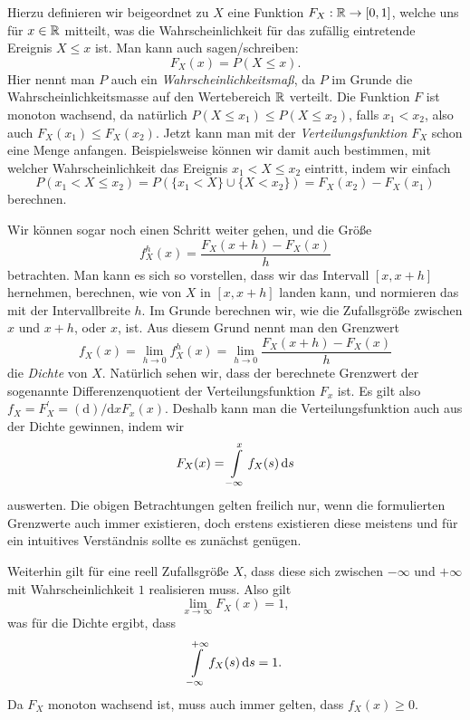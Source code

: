 Hierzu definieren wir beigeordnet zu $X$ eine Funktion $F_X: \mathbb{R} \rightarrow [0,1]$, welche uns für $x \in \mathbb{R}$ mitteilt, was die Wahrscheinlichkeit für das zufällig eintretende Ereignis $X \leqslant x$ ist.
Man kann auch sagen/schreiben:
\begin{equation}
    \label{eq:random:cdf}
    F_X(x) = P(X \leqslant x).
\end{equation}
Hier nennt man $P$ auch ein \emph{Wahrscheinlichkeitsmaß}, da $P$ im Grunde die Wahrscheinlichkeitsmasse auf den Wertebereich $\mathbb{R}$ verteilt.
Die Funktion $F$ ist monoton wachsend, da natürlich $P(X \leqslant x_1) \leqslant P(X \leqslant x_2)$, falls $x_1 < x_2$, also auch $F_X(x_1) \leqslant F_X(x_2)$.
Jetzt kann man mit der \emph{Verteilungsfunktion} $F_X$ schon eine Menge anfangen.
Beispielsweise können wir damit auch bestimmen, mit welcher Wahrscheinlichkeit das Ereignis $x_1 < X \leqslant x_2$ eintritt, indem wir einfach 
\[
P(x_1 < X \leqslant x_2) = P(\{x_1 < X\} \cup \{X < x_2\}) = F_X(x_2) - F_X(x_1)
\]
berechnen.

Wir können sogar noch einen Schritt weiter gehen, und die Größe
\begin{equation}
    \label{eq:random:pdf_approx}
    f^h_X(x) = \frac{F_X(x + h) - F_X(x)}{h}
\end{equation}
betrachten.
Man kann es sich so vorstellen, dass wir das Intervall $[x,x+h]$ hernehmen, berechnen, wie  von $X$ in $[x,x+h]$ landen kann, und normieren das mit der Intervallbreite $h$.
Im Grunde berechnen wir, wie  die Zufallsgröße zwischen $x$ und $x+h$, oder  $x$, ist.
Aus diesem Grund nennt man den Grenzwert
\begin{equation}
    \label{eq:random:density}
    f_X(x) = \lim\limits_{h \rightarrow 0} f^h_X(x) = \lim\limits_{h \rightarrow 0} \frac{F_X(x + h) - F_X(x)}{h}
\end{equation}
die \emph{Dichte} von $X$.
Natürlich sehen wir, dass der berechnete Grenzwert der sogenannte Differenzenquotient der Verteilungsfunktion $F_x$ ist. Es gilt also $f_X = F^\prime_X = (\mathrm d)/{\mathrm d x} F_{x}(x)$.
Deshalb kann man die Verteilungsfunktion auch aus der Dichte gewinnen, indem wir
\[
F_X(x) = {\int\limits_{-\infty}^{x}{f_X(s)}\,\mathrm{d}{s}}
\]
auswerten.
Die obigen Betrachtungen gelten freilich nur, wenn die formulierten Grenzwerte auch immer existieren, doch erstens existieren diese meistens und für ein intuitives Verständnis sollte es zunächst genügen.

Weiterhin gilt für eine reell Zufallsgröße $X$, dass diese sich  zwischen $-\infty$ und $+\infty$ mit Wahrscheinlichkeit $1$ realisieren muss.
Also gilt
\[
\lim_{x \rightarrow \infty} F_X(x) = 1,
\]
was für die Dichte ergibt, dass
\[
{\int\limits_{-\infty}^{+\infty}{f_X(s)}\,\mathrm{d}{s}} = 1.
\]
Da $F_X$ monoton wachsend ist, muss auch immer gelten, dass $f_X(x) \geqslant 0$.
%
%
